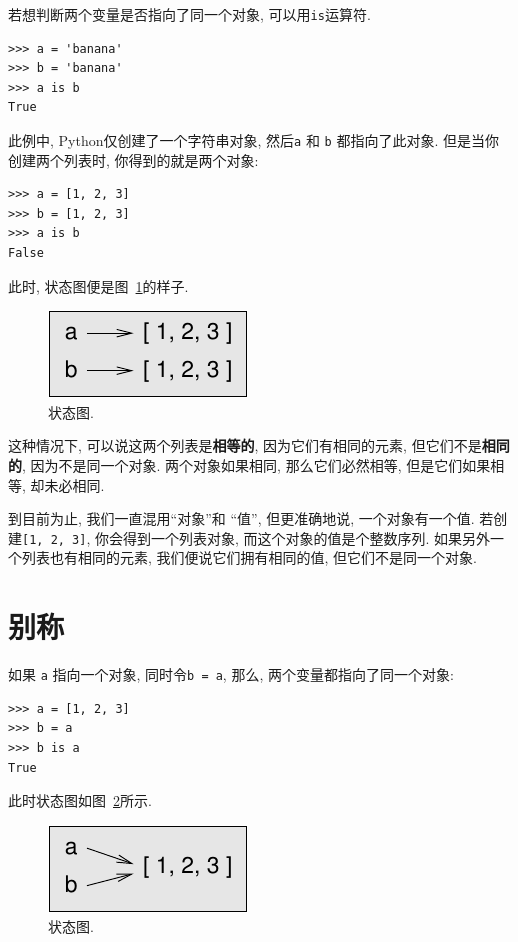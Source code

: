 \documentclass[10pt]{book}
\begin{document}
若想判断两个变量是否指向了同一个对象, 可以用{\tt is}运算符.

\begin{verbatim}
>>> a = 'banana'
>>> b = 'banana'
>>> a is b
True
\end{verbatim}
%
此例中, Python仅创建了一个字符串对象, 然后{\tt a} 
和 {\tt b} 都指向了此对象. 
但是当你创建两个列表时, 你得到的就是两个对象:

\begin{verbatim}
>>> a = [1, 2, 3]
>>> b = [1, 2, 3]
>>> a is b
False
\end{verbatim}
%

此时, 状态图便是图~\ref{fig.list2}的样子.

\begin{figure}
\centerline
{\includegraphics[scale=0.8]{figs/list2.pdf}}
\caption{状态图.}
\label{fig.list2}
\end{figure}

这种情况下, 可以说这两个列表是{\bf 相等的},
因为它们有相同的元素, 
但它们不是{\bf 相同的}, 因为不是同一个对象. 
两个对象如果相同, 那么它们必然相等, 
但是它们如果相等, 却未必相同. 

到目前为止, 我们一直混用``对象''和 ``值'', 但更准确地说, 
一个对象有一个值. 若创建{\tt [1, 2, 3]}, 你会得到一个列表对象, 
而这个对象的值是个整数序列. 
如果另外一个列表也有相同的元素, 我们便说它们拥有相同的值, 
但它们不是同一个对象. 


\section{别称}

如果 {\tt a} 指向一个对象, 同时令{\tt b = a},
那么, 两个变量都指向了同一个对象:

\begin{verbatim}
>>> a = [1, 2, 3]
>>> b = a
>>> b is a
True
\end{verbatim}
%
此时状态图如图~\ref{fig.list3}所示.

\begin{figure}
\centerline
{\includegraphics[scale=0.8]{figs/list3.pdf}}
\caption{状态图.}
\label{fig.list3}
\end{figure}
\end{document}
